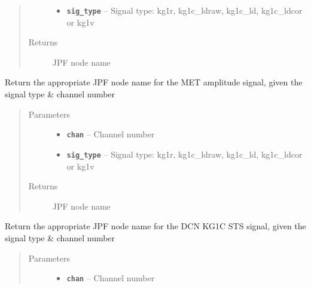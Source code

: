 \documentclass[letterpaper,10pt,english]{sphinxmanual}
\begin{document}
\begin{fulllineitems}
\begin{fulllineitems}
\begin{quote}
\begin{description}
\begin{itemize}
\item {} 
\textbf{\texttt{sig\_type}} -- Signal type: kg1r, kg1c\_ldraw, kg1c\_ld, kg1c\_ldcor or kg1v

\end{itemize}

\item[{Returns}] \leavevmode
JPF node name

\end{description}\end{quote}

\end{fulllineitems}


\begin{fulllineitems}
\label{consts:consts.Consts.get_amp_node_met}
Return the appropriate JPF node name for the MET amplitude signal, given the signal type \& channel number
\begin{quote}\begin{description}
\item[{Parameters}] \leavevmode\begin{itemize}
\item {} 
\textbf{\texttt{chan}} -- Channel number

\item {} 
\textbf{\texttt{sig\_type}} -- Signal type: kg1r, kg1c\_ldraw, kg1c\_ld, kg1c\_ldcor or kg1v

\end{itemize}

\item[{Returns}] \leavevmode
JPF node name

\end{description}\end{quote}

\end{fulllineitems}


\begin{fulllineitems}
\label{consts:consts.Consts.get_sts_node_dcn}
Return the appropriate JPF node name for the DCN KG1C STS signal, given the signal type \& channel number
\begin{quote}\begin{description}
\item[{Parameters}] \leavevmode\begin{itemize}
\item {} 
\textbf{\texttt{chan}} -- Channel number


\end{itemize}
\end{description}
\end{quote}
\end{fulllineitems}
\end{fulllineitems}
\end{document}
